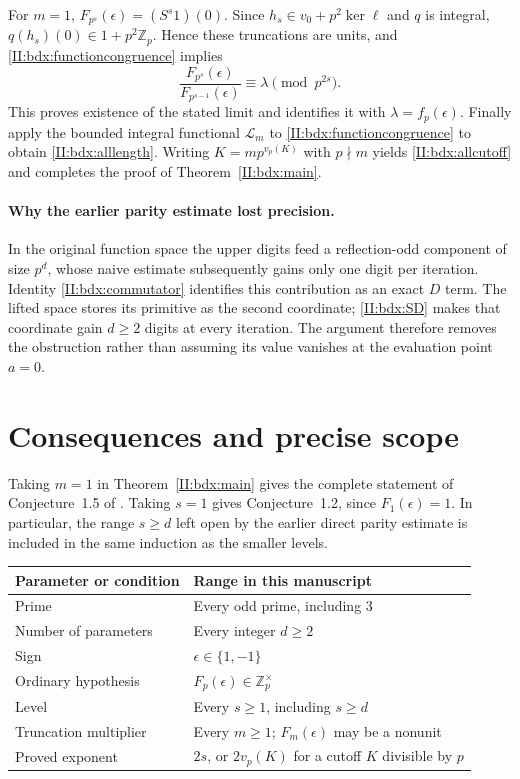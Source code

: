 \documentclass[11pt,letterpaper]{article}
\theoremstyle{definition}
\theoremstyle{remark}
\begin{document}
For $m=1$, $F_{p^s}(\epsilon)=(S^s1)(0)$.
Since $h_s\in v_0+p^2\ker\ell$ and $q$ is integral,
$q(h_s)(0)\in1+p^2\mathbb Z_p$. Hence these truncations are units,
and \eqref{II:bdx:functioncongruence} implies
\[
 \frac{F_{p^s}(\epsilon)}{F_{p^{s-1}}(\epsilon)}
                    \equiv\lambda\pmod{p^{2s}}.
\]
This proves existence of the stated limit and identifies it with
$\lambda=f_p(\epsilon)$.
Finally apply the bounded integral functional $\mathcal L_m$ to
\eqref{II:bdx:functioncongruence} to obtain \eqref{II:bdx:alllength}.
Writing $K=mp^{v_p(K)}$ with $p\nmid m$ yields
\eqref{II:bdx:allcutoff} and completes the proof of
Theorem~\ref{II:bdx:main}.

\paragraph{Why the earlier parity estimate lost precision.}
In the original function space the upper digits feed a reflection-odd
component of size $p^d$, whose naive estimate subsequently gains only
one digit per iteration. Identity \eqref{II:bdx:commutator} identifies
this contribution as an exact $D$ term. The lifted space stores its
primitive as the second coordinate; \eqref{II:bdx:SD} makes that coordinate
gain $d\ge2$ digits at every iteration. The argument therefore removes
the obstruction rather than assuming its value vanishes at the
evaluation point $a=0$.


\section{Consequences and precise scope}

Taking $m=1$ in Theorem~\ref{II:bdx:main} gives the complete statement of
Conjecture~1.5 of \cite{I:BD}. Taking $s=1$ gives Conjecture~1.2, since
$F_1(\epsilon)=1$. In particular, the range $s\ge d$ left open by
the earlier direct parity estimate is included in the same induction
as the smaller levels.

\begin{center}
\begin{tabular}{@{}p{}p{}@{}}
\toprule
Parameter or condition & Range in this manuscript \\
\midrule
Prime & Every odd prime, including $3$ \\
Number of parameters & Every integer $d\ge2$ \\
Sign & $\epsilon\in\{1,-1\}$ \\
Ordinary hypothesis & $F_p(\epsilon)\in\mathbb Z_p^\times$ \\
Level & Every $s\ge1$, including $s\ge d$ \\
Truncation multiplier & Every $m\ge1$; $F_m(\epsilon)$ may be a nonunit \\
Proved exponent & $2s$, or $2v_p(K)$ for a cutoff $K$ divisible by $p$ \\
\bottomrule
\end{tabular}
\end{center}
\end{document}
